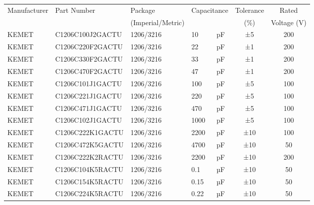 
\begin{tabular}{lllllcc}
Manufacturer & Part Number      & Package & \multicolumn{2}{l}{Capacitance} & Tolerance & Rated  \\
 & & (Imperial/Metric) & & & (\%) & Voltage (V) \\
\hline
KEMET        & C1206C100J2GACTU & 1206/3216                 & 10              & pF            & ±5           & 200               \\
KEMET        & C1206C220F2GACTU & 1206/3216                 & 22              & pF            & ±1           & 200               \\
KEMET        & C1206C330F2GACTU & 1206/3216                 & 33              & pF            & ±1           & 200               \\
KEMET        & C1206C470F2GACTU & 1206/3216                 & 47              & pF            & ±1           & 200               \\
KEMET        & C1206C101J1GACTU & 1206/3216                 & 100             & pF            & ±5           & 100               \\
KEMET        & C1206C221J1GACTU & 1206/3216                 & 220             & pF            & ±5           & 100               \\
KEMET        & C1206C471J1GACTU & 1206/3216                 & 470             & pF            & ±5           & 100               \\
KEMET        & C1206C102J1GACTU & 1206/3216                 & 1000            & pF            & ±5           & 100               \\
KEMET        & C1206C222K1GACTU & 1206/3216                 & 2200            & pF            & ±10          & 100               \\
KEMET        & C1206C472K5GACTU & 1206/3216                 & 4700            & pF            & ±10          & 50                \\
KEMET        & C1206C222K2RACTU & 1206/3216                 & 2200            & pF            & ±10          & 200               \\
KEMET        & C1206C104K5RACTU & 1206/3216                 & 0.1             & µF            & ±10          & 50                \\
KEMET        & C1206C154K5RACTU & 1206/3216                 & 0.15            & µF            & ±10          & 50                \\
KEMET        & C1206C224K5RACTU & 1206/3216                 & 0.22            & µF            & ±10          & 50                \\

\end{tabular}
